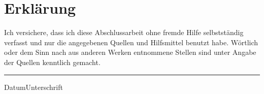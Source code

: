 \thispagestyle{empty}
\maketitle

\blankpage

\thispagestyle{empty}


\blankpage

\thispagestyle{empty}
\vspace{10ex}
\section*{Erklärung}
Ich  versichere, dass  ich diese  Abschlussarbeit ohne  fremde  Hilfe selbstständig
verfasst und  nur die  angegebenen Quellen und  Hilfsmittel benutzt  habe. Wörtlich
oder dem  Sinn nach  aus anderen  Werken entnommene Stellen  sind unter  Angabe der
Quellen kenntlich gemacht.
\vspace{10ex}\\

\hrule
{\small{Datum}}\hfill{\small{Unterschrift}}

\clearpage

\thispagestyle{empty}
\tableofcontents

\blankpage



